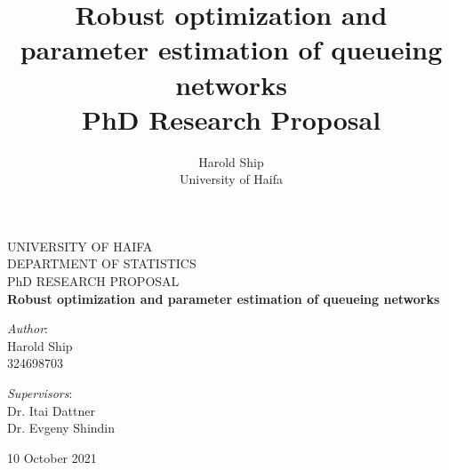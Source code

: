 \documentclass[11pt,a4paper,titlepage]{article}
\title{Robust optimization and parameter estimation of queueing networks \\ PhD Research Proposal}
\author{Harold Ship \\ University of Haifa}
\theoremstyle{definition}
\theoremstyle{plain}
\begin{document}

    \begin{titlepage}

        \begin{center}
            \linespread{1.5}
            {\large UNIVERSITY OF HAIFA} \medskip \\
            {\large DEPARTMENT OF STATISTICS} \vspace*{0.5cm} \\
            {\Large PhD RESEARCH PROPOSAL} \vspace*{2.0cm} \\
            \linespread{2}
            {\huge \textbf{Robust optimization and parameter estimation of queueing networks}} \vspace*{2.3cm}
        \end{center}

        \begin{minipage}[t]{0.5\textwidth}
            \begin{flushleft}
                {\large \textit{Author}:\vspace*{0.5cm} \\ Harold Ship \\
                    324698703
                }
            \end{flushleft}
        \end{minipage}%
        \begin{minipage}[t]{0.5\textwidth}
            \begin{flushright}
                {\large \textit{Supervisors}:\vspace*{0.5cm} \\Dr. Itai Dattner\vspace*{0.1cm}\\Dr. Evgeny Shindin\\
                }
                \vspace*{0.5cm}
            \end{flushright}
        \end{minipage}%

        \begin{center}
            \begin{minipage}[b]{0.5\textwidth}
                \vfill
                \begin{center}
                    {\large 10 October 2021}
                \end{center}
            \end{minipage}%
        \end{center}

        \thispagestyle{empty}

    \end{titlepage}
\end{document}
